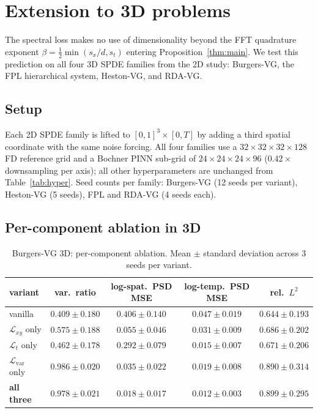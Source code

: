 \documentclass[review,12pt]{elsarticle}
\begin{document}
\section{Extension to 3D problems}
\label{sec:3d}

The spectral loss makes no use of dimensionality beyond the FFT
quadrature exponent
\(\beta = \tfrac{1}{2}\min(s_x/d, s_t)\) entering
Proposition~\ref{thm:main}. We test this prediction on all four 3D SPDE
families from the 2D study: Burgers-VG, the FPL hierarchical system,
Heston-VG, and RDA-VG.

\subsection{Setup}
\label{subsec:3d-setup}

Each 2D SPDE family is lifted to \([0,1]^3 \times [0, T]\) by adding
a third spatial coordinate with the same noise forcing. All four families use
a \(32 \times 32 \times 32 \times 128\) FD reference grid and a Bochner
PINN sub-grid of \(24 \times 24 \times 24 \times 96\) (\(0.42\times\)
downsampling per axis); all other hyperparameters are unchanged from
Table~\ref{tab:hyper}. Seed counts per family: Burgers-VG (12 seeds per
variant), Heston-VG (5 seeds), FPL and RDA-VG (4 seeds each).

\subsection{Per-component ablation in 3D}

\begin{table}[h]
\centering
\caption{Burgers-VG 3D: per-component ablation. Mean \(\pm\) standard
deviation across 3 seeds per variant.}
\label{tab:burgers3d-ablation}
\begin{tabular}{l c c c c}
\toprule
variant & var.\ ratio & log-spat.\ PSD MSE & log-temp.\ PSD MSE & rel.\ \(L^2\) \\
\midrule
vanilla               & \(0.409 \pm 0.180\) & \(0.406 \pm 0.140\) & \(0.047 \pm 0.019\) & \(0.644 \pm 0.193\) \\
\(\mathcal{L}_{xy}\) only      & \(0.575 \pm 0.188\) & \(0.055 \pm 0.046\) & \(0.031 \pm 0.009\) & \(0.686 \pm 0.202\) \\
\(\mathcal{L}_{t}\) only       & \(0.462 \pm 0.178\) & \(0.292 \pm 0.079\) & \(0.015 \pm 0.007\) & \(0.671 \pm 0.206\) \\
\(\mathcal{L}_{\mathrm{var}}\) only & \(\mathbf{0.986 \pm 0.020}\) & \(0.035 \pm 0.022\) & \(0.019 \pm 0.008\) & \(0.890 \pm 0.314\) \\
\textbf{all three}          & \(\mathbf{0.978 \pm 0.021}\) & \(\mathbf{0.018 \pm 0.017}\) & \(\mathbf{0.012 \pm 0.003}\) & \(0.899 \pm 0.295\) \\
\bottomrule
\end{tabular}
\end{table}
\end{document}
